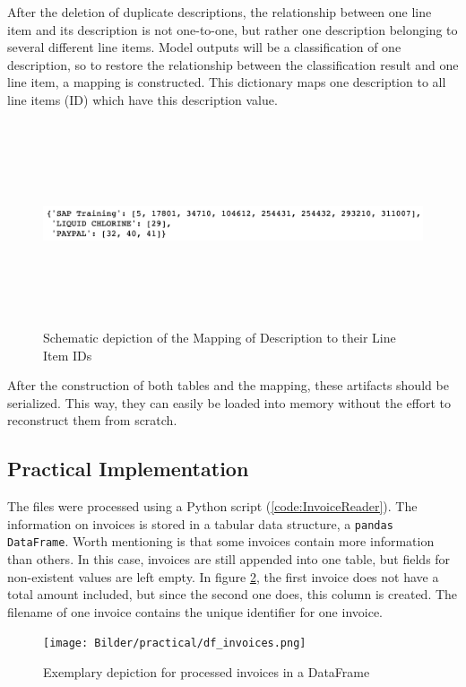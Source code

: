 	After the deletion of duplicate descriptions, the relationship between one line item and its description is not one-to-one, but rather one description belonging to several different line items. Model outputs will be a classification of one description, so to restore the relationship between the classification result and one line item, a mapping is constructed.
	This dictionary maps one description to all line items (ID) which have this description value.
	\begin{figure}[ht]
		\centering
		\includegraphics[height=6cm]{Bilder/description_map.png}
		\caption{Schematic depiction of the Mapping of Description to their Line Item IDs}
		\label{fig:mapping}
	\end{figure}


	After the construction of both tables and the mapping, these artifacts should be serialized. This way, they can easily be loaded into memory without the effort to reconstruct them from scratch.
	
    \subsection{Practical Implementation}
	
	The files were processed using a Python script (\ref{code:InvoiceReader}). The information on invoices is stored in a tabular data structure, a \lstinline|pandas DataFrame|. Worth mentioning is that some invoices contain more information than others. In this case, invoices are still appended into one table, but fields for non-existent values are left empty. In figure \ref{fig:df-invoices}, the first invoice does not have a total amount included, but since the second one does, this column is created.
	The filename of one invoice contains the unique identifier for one invoice.
	
	\begin{figure}[ht]
		\centering
		\texttt{[image: Bilder/practical/df\_invoices.png]}
		\caption{Exemplary depiction for processed invoices in a DataFrame}
		\label{fig:df-invoices}
	\end{figure}

